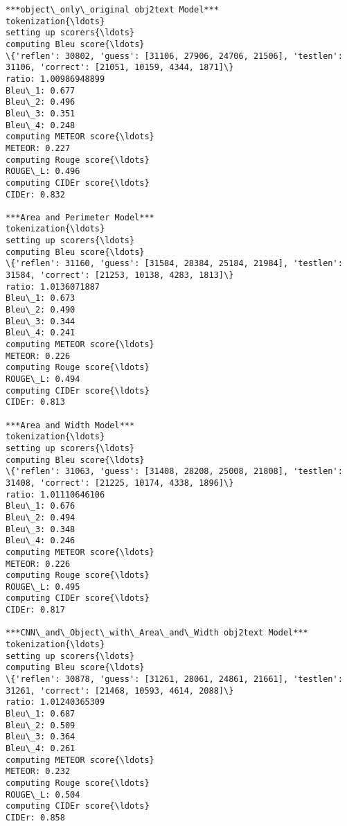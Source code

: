 \documentclass[11pt]{article}
\begin{document}
    \begin{Verbatim}[commandchars=\\\{\}]
***object\_only\_original obj2text Model***
tokenization{\ldots}
setting up scorers{\ldots}
computing Bleu score{\ldots}
\{'reflen': 30802, 'guess': [31106, 27906, 24706, 21506], 'testlen': 31106, 'correct': [21051, 10159, 4344, 1871]\}
ratio: 1.00986948899
Bleu\_1: 0.677
Bleu\_2: 0.496
Bleu\_3: 0.351
Bleu\_4: 0.248
computing METEOR score{\ldots}
METEOR: 0.227
computing Rouge score{\ldots}
ROUGE\_L: 0.496
computing CIDEr score{\ldots}
CIDEr: 0.832

***Area and Perimeter Model***
tokenization{\ldots}
setting up scorers{\ldots}
computing Bleu score{\ldots}
\{'reflen': 31160, 'guess': [31584, 28384, 25184, 21984], 'testlen': 31584, 'correct': [21253, 10138, 4283, 1813]\}
ratio: 1.0136071887
Bleu\_1: 0.673
Bleu\_2: 0.490
Bleu\_3: 0.344
Bleu\_4: 0.241
computing METEOR score{\ldots}
METEOR: 0.226
computing Rouge score{\ldots}
ROUGE\_L: 0.494
computing CIDEr score{\ldots}
CIDEr: 0.813

***Area and Width Model***
tokenization{\ldots}
setting up scorers{\ldots}
computing Bleu score{\ldots}
\{'reflen': 31063, 'guess': [31408, 28208, 25008, 21808], 'testlen': 31408, 'correct': [21225, 10174, 4338, 1896]\}
ratio: 1.01110646106
Bleu\_1: 0.676
Bleu\_2: 0.494
Bleu\_3: 0.348
Bleu\_4: 0.246
computing METEOR score{\ldots}
METEOR: 0.226
computing Rouge score{\ldots}
ROUGE\_L: 0.495
computing CIDEr score{\ldots}
CIDEr: 0.817

***CNN\_and\_Object\_with\_Area\_and\_Width obj2text Model***
tokenization{\ldots}
setting up scorers{\ldots}
computing Bleu score{\ldots}
\{'reflen': 30878, 'guess': [31261, 28061, 24861, 21661], 'testlen': 31261, 'correct': [21468, 10593, 4614, 2088]\}
ratio: 1.01240365309
Bleu\_1: 0.687
Bleu\_2: 0.509
Bleu\_3: 0.364
Bleu\_4: 0.261
computing METEOR score{\ldots}
METEOR: 0.232
computing Rouge score{\ldots}
ROUGE\_L: 0.504
computing CIDEr score{\ldots}
CIDEr: 0.858


    \end{Verbatim}
\end{document}
